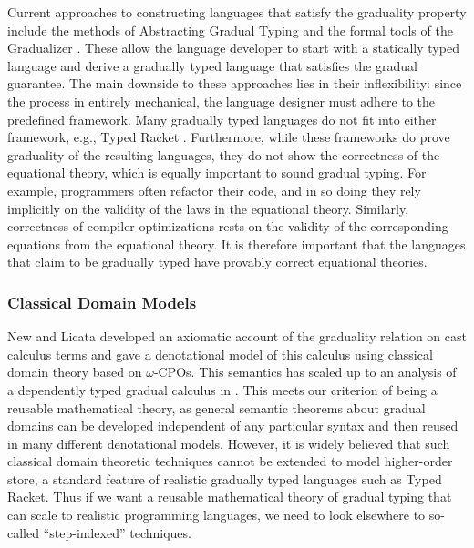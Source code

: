 Current approaches to constructing languages that satisfy the graduality property
include the methods of Abstracting Gradual Typing
\cite{garcia-clark-tanter2016} and the formal tools of the Gradualizer \cite{cimini-siek2016}.
These allow the language developer to start with a statically typed language and derive a
gradually typed language that satisfies the gradual guarantee. The main downside to
these approaches lies in their inflexibility: since the process in entirely mechanical,
the language designer must adhere to the predefined framework.
Many gradually typed languages do not fit into either framework, e.g., Typed Racket
\cite{tobin-hochstadt06, tobin-hochstadt08}.
%
Furthermore, while these frameworks do prove graduality of the resulting languages,
they do not show the correctness of the equational theory, which is equally important
to sound gradual typing.
For example, programmers often refactor their code, and in so doing they rely
implicitly on the validity of the laws in the equational theory.
Similarly, correctness of compiler optimizations rests on the validity of the
corresponding equations from the equational theory. It is therefore important
that the languages that claim to be gradually typed have provably correct
equational theories.




\subsubsection{Classical Domain Models}

New and Licata \cite{new-licata18} developed an axiomatic account of the
graduality relation on cast calculus terms and gave a denotational
model of this calculus using classical domain theory based on
$\omega$-CPOs. This semantics has scaled up to an analysis of a
dependently typed gradual calculus in \cite{asdf}. This meets our
criterion of being a reusable mathematical theory, as general semantic
theorems about gradual domains can be developed independent of any
particular syntax and then reused in many different denotational
models. However, it is widely believed that such classical domain
theoretic techniques cannot be extended to model higher-order store, a
standard feature of realistic gradually typed languages such as Typed
Racket. Thus if we want a reusable mathematical theory of gradual
typing that can scale to realistic programming languages, we need to
look elsewhere to so-called ``step-indexed'' techniques.

